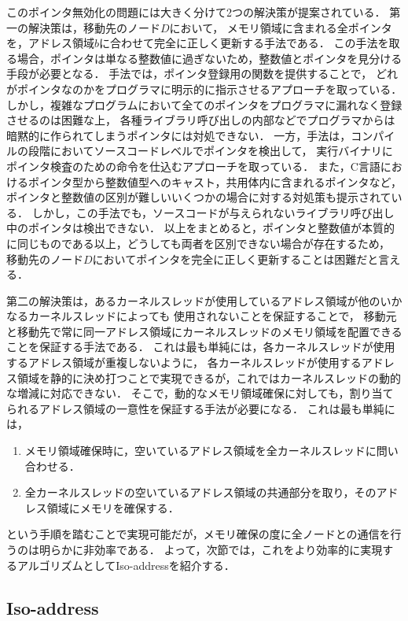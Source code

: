 \documentclass[10pt]{jsarticle}
\begin{document}
このポインタ無効化の問題には大きく分けて2つの解決策が提案されている．
第一の解決策は，移動先のノード$D$において，
メモリ領域に含まれる全ポインタを，アドレス領域$b$に合わせて完全に正しく更新する手法である．
この手法を取る場合，ポインタは単なる整数値に過ぎないため，整数値とポインタを見分ける手段が必要となる．
手法\cite{t8}では，ポインタ登録用の関数を提供することで，
どれがポインタなのかをプログラマに明示的に指示させるアプローチを取っている．
しかし，複雑なプログラムにおいて全てのポインタをプログラマに漏れなく登録させるのは困難な上，
各種ライブラリ呼び出しの内部などでプログラマからは暗黙的に作られてしまうポインタには対処できない．
一方，手法\cite{t9}は，コンパイルの段階においてソースコードレベルでポインタを検出して，
実行バイナリにポインタ検査のための命令を仕込むアプローチを取っている．
また，C言語におけるポインタ型から整数値型へのキャスト，共用体内に含まれるポインタなど，
ポインタと整数値の区別が難しいいくつかの場合に対する対処策も提示されている．
しかし，この手法でも，ソースコードが与えられないライブラリ呼び出し中のポインタは検出できない．
以上をまとめると，ポインタと整数値が本質的に同じものである以上，どうしても両者を区別できない場合が存在するため，
移動先のノード$D$においてポインタを完全に正しく更新することは困難だと言える．

第二の解決策は，あるカーネルスレッドが使用しているアドレス領域が他のいかなるカーネルスレッドによっても
使用されないことを保証することで，
移動元と移動先で常に同一アドレス領域にカーネルスレッドのメモリ領域を配置できることを保証する手法である．
これは最も単純には，各カーネルスレッドが使用するアドレス領域が重複しないように，
各カーネルスレッドが使用するアドレス領域を静的に決め打つことで実現できるが，これではカーネルスレッドの動的な増減に対応できない．
そこで，動的なメモリ領域確保に対しても，割り当てられるアドレス領域の一意性を保証する手法が必要になる．
これは最も単純には，
\begin{enumerate}
\item メモリ領域確保時に，空いているアドレス領域を全カーネルスレッドに問い合わせる．
\item 全カーネルスレッドの空いているアドレス領域の共通部分を取り，そのアドレス領域にメモリを確保する．
\end{enumerate}
という手順を踏むことで実現可能だが，メモリ確保の度に全ノードとの通信を行うのは明らかに非効率である．
よって，次節では，これをより効率的に実現するアルゴリズムとしてIso-address\cite{t4,t5}を紹介する．

\subsection{Iso-address}
\end{document}
